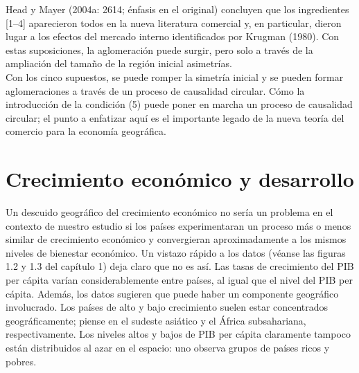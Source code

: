 Head y Mayer (2004a: 2614; énfasis en el original) concluyen que los ingredientes [1–4] aparecieron todos en la nueva literatura comercial y, en particular, dieron lugar a los efectos del mercado interno identificados por Krugman (1980). Con estas suposiciones, la aglomeración puede surgir, pero solo a través de la ampliación del tamaño de la región inicial asimetrías. \\
Con los cinco supuestos, se puede romper la simetría inicial y se pueden formar aglomeraciones a través de un proceso de causalidad circular. Cómo la introducción de la condición (5) puede poner en marcha un proceso de causalidad circular; el punto a enfatizar aquí es el importante legado de la nueva teoría del comercio para la economía geográfica. 

\section{Crecimiento económico y desarrollo}
Un descuido geográfico del crecimiento económico no sería un problema en el contexto de nuestro estudio si los países experimentaran un proceso más o menos similar de crecimiento económico y convergieran aproximadamente a los mismos niveles de bienestar económico. Un vistazo rápido a los datos (véanse las figuras 1.2 y 1.3 del capítulo 1) deja claro que no es así. Las tasas de crecimiento del PIB per cápita varían considerablemente entre países, al igual que el nivel del PIB per cápita. Además, los datos sugieren que puede haber un componente geográfico involucrado. Los países de alto y bajo crecimiento suelen estar concentrados geográficamente; piense en el sudeste asiático y el África subsahariana, respectivamente. Los niveles altos y bajos de PIB per cápita claramente tampoco están distribuidos al azar en el espacio: uno observa grupos de países ricos y pobres.

